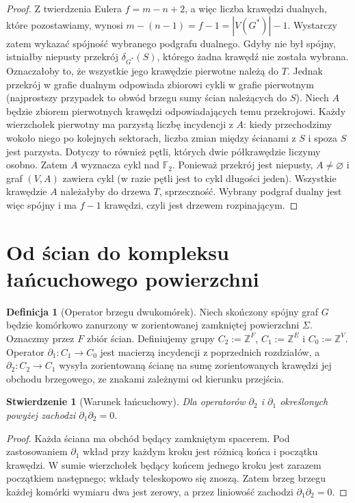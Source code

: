 \documentclass[11pt,a4paper]{report}
\numberwithin{equation}{section}
\theoremstyle{plain}
\newtheorem{stwierdzenie}[twierdzenie]{Stwierdzenie}
\theoremstyle{definition}
\newtheorem{definicja}[twierdzenie]{Definicja}
\theoremstyle{remark}
\begin{document}
\begin{proof}
Z twierdzenia Eulera $f=m-n+2$, a więc liczba krawędzi
dualnych, które pozostawiamy, wynosi
$m-(n-1)=f-1=|V(G^*)|-1$.
Wystarczy zatem wykazać spójność wybranego podgrafu dualnego.
Gdyby nie był spójny, istniałby niepusty przekrój
$\delta_{G^*}(S)$, którego żadna krawędź nie została
wybrana. Oznaczałoby to, że wszystkie jego krawędzie
pierwotne należą do $T$. Jednak przekrój w grafie
dualnym odpowiada zbiorowi cykli w grafie pierwotnym
(najprostszy przypadek to obwód brzegu sumy ścian
należących do $S$). Niech $A$ będzie zbiorem pierwotnych krawędzi odpowiadających
temu przekrojowi. Każdy wierzchołek pierwotny ma parzystą
liczbę incydencji z $A$: kiedy przechodzimy wokoło niego
po kolejnych sektorach, liczba zmian między ścianami z $S$
i spoza $S$ jest parzysta. Dotyczy to również pętli,
których dwie półkrawędzie liczymy osobno. Zatem $A$
wyznacza cykl nad $\mathbb F_2$. Ponieważ przekrój jest
niepusty, $A\ne\varnothing$ i graf $(V,A)$ zawiera cykl
(w razie pętli jest to cykl długości jeden). Wszystkie
krawędzie $A$ należałyby do drzewa $T$, sprzeczność.
Wybrany podgraf dualny jest więc spójny i ma $f-1$
krawędzi, czyli jest drzewem rozpinającym.
\end{proof}

\section{Od ścian do kompleksu łańcuchowego powierzchni}
\label{sec:tg-surface-chains}

\begin{definicja}[Operator brzegu dwukomórek]
Niech skończony spójny graf $G$ będzie komórkowo zanurzony
w zorientowanej zamkniętej powierzchni $\Sigma$.
Oznaczmy przez $F$ zbiór ścian. Definiujemy grupy
$C_2:=\mathbb Z^F$, $C_1:=\mathbb Z^E$ i
$C_0:=\mathbb Z^V$. Operator $\partial_1:C_1\to C_0$
jest macierzą incydencji z poprzednich rozdziałów,
a $\partial_2:C_2\to C_1$ wysyła zorientowaną ścianę
na sumę zorientowanych krawędzi jej obchodu brzegowego,
ze znakami zależnymi od kierunku przejścia.
\end{definicja}

\begin{stwierdzenie}[Warunek łańcuchowy]
Dla operatorów $\partial_2$ i $\partial_1$ określonych
powyżej zachodzi $\partial_1\partial_2=0$.
\end{stwierdzenie}

\begin{proof}
Każda ściana ma obchód będący zamkniętym spacerem.
Pod zastosowaniem $\partial_1$ wkład przy każdym kroku
jest różnicą końca i początku krawędzi. W sumie
wierzchołek będący końcem jednego kroku jest zarazem
początkiem następnego; wkłady teleskopowo się znoszą.
Zatem brzeg brzegu każdej komórki wymiaru dwa jest zerowy,
a przez liniowość zachodzi $\partial_1\partial_2=0$.
\end{proof}
\end{document}
